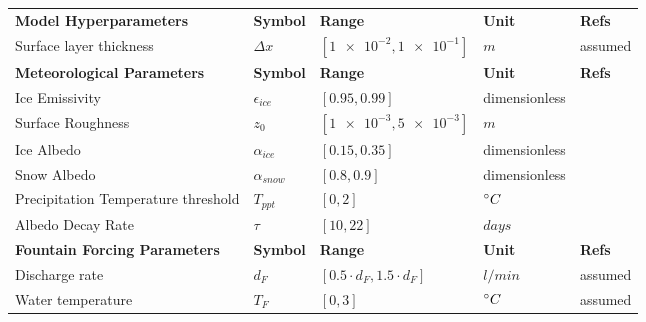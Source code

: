 \begin{table}
\begin{tabular}{lllll}
		\textbf{Model Hyperparameters}       & \textbf{Symbol}  & \textbf{Range}                      & \textbf{Unit}                 & \textbf{Refs}                                          \\
		Surface layer thickness              & $\Delta x$       & $[\num{1e-2},\num{1e-1}]$           & $m$                           & assumed
		\\\midrule
		\textbf{Meteorological Parameters}   & \textbf{Symbol}  & \textbf{Range}                      & \textbf{Unit}                 & \textbf{Refs}                                          \\
		Ice Emissivity                       & $\epsilon_{ice}$ & $[0.95,0.99]$                       & dimensionless                 & \cite{horiInsituMeasuredSpectral2006}                  \\
		Surface Roughness                    & $z_0$            & $[\num{1e-3},\num{5e-3}]$           & $m$                           & \cite{brockMeasurementParameterizationAerodynamic2006} \\
		Ice Albedo                           & $\alpha_{ice}$   & $[0.15,0.35]$                       & dimensionless                 &
		\cite{steinerModellingIcecliffBackwasting2015, zollesRobustUncertaintyAssessment2019}                                                                                                  \\
		Snow Albedo                          & $\alpha_{snow}$  & $[0.8,0.9]$                         & dimensionless                 & \cite{zollesRobustUncertaintyAssessment2019}           \\
		Precipitation Temperature threshold  & $T_{ppt}$        & $[0,2]$                             & $^{\circ} C$                   & \cite{shichangResponseZhadangGlacier2010}              \\
		Albedo Decay Rate                    & $\tau$           & $[10,22]$                           & $days$                        &
		\cite{schmidtImportanceAccurateGlacier2017, oerlemansYearRecordGlobal1998}                                                                                                             \\\midrule
		\textbf{Fountain Forcing Parameters} & \textbf{Symbol}  & \textbf{Range}                      & \textbf{Unit}                 & \textbf{Refs}                                          \\
		Discharge rate                       & $d_{F}$          & $[0.5 \cdot d_{F},1.5 \cdot d_{F}]$ & $l/min$                       & assumed                                                \\
		Water temperature                    & $T_{F}$          & $[0,3]$                             & $^{\circ} C$                   & assumed                                                \\\bottomrule
	\end{tabular}
\end{table}

